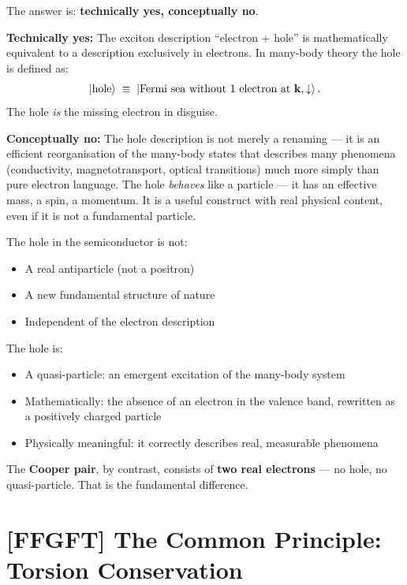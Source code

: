 The answer is: \textbf{technically yes, conceptually no}.

\textbf{Technically yes:}
The exciton description ``electron + hole'' is mathematically
equivalent to a description exclusively in electrons.
In many-body theory the hole is defined as:
\begin{equation}
  \left|\text{hole}\right\rangle \;\equiv\; \left|\text{Fermi sea without 1 electron at }
  \mathbf{k}, \downarrow\right\rangle.
\end{equation}
The hole \emph{is} the missing electron in disguise.

\textbf{Conceptually no:}
The hole description is not merely a renaming ---
it is an efficient reorganisation of the many-body states
that describes many phenomena (conductivity, magnetotransport,
optical transitions) much more simply than pure
electron language.
The hole \emph{behaves} like a particle --- it has
an effective mass, a spin, a momentum.
It is a useful construct with real physical content,
even if it is not a fundamental particle.

\begin{keypoint}
The hole in the semiconductor is not:
\begin{itemize}
  \item A real antiparticle (not a positron)
  \item A new fundamental structure of nature
  \item Independent of the electron description
\end{itemize}

The hole is:
\begin{itemize}
  \item A quasi-particle: an emergent excitation of the
    many-body system
  \item Mathematically: the absence of an electron in the
    valence band, rewritten as a positively charged particle
  \item Physically meaningful: it correctly describes real,
    measurable phenomena
\end{itemize}

The \textbf{Cooper pair}, by contrast, consists of
\textbf{two real electrons} --- no hole,
no quasi-particle. That is the fundamental difference.
\end{keypoint}

\section{[FFGFT] The Common Principle: Torsion Conservation}
\label{sec:torsion-conservation}

